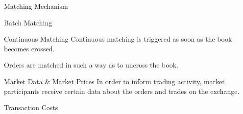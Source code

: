 \documentclass{beamer}
\begin{document}
\begin{frame}{Matching Mechanism}
\end{frame}

\begin{frame}{Batch Matching}
\end{frame}

\begin{frame}{Continuous Matching}
	Continuous matching is triggered as soon as the book becomes crossed.

	Orders are matched in such a way as to uncross the book.
\end{frame}

\begin{frame}{Market Data \& Market Prices}
	In order to inform trading activity, market participants receive certain data about the orders and trades on the exchange.




\end{frame}

\begin{frame}{Transaction Costs}



\end{frame}
\end{document}
